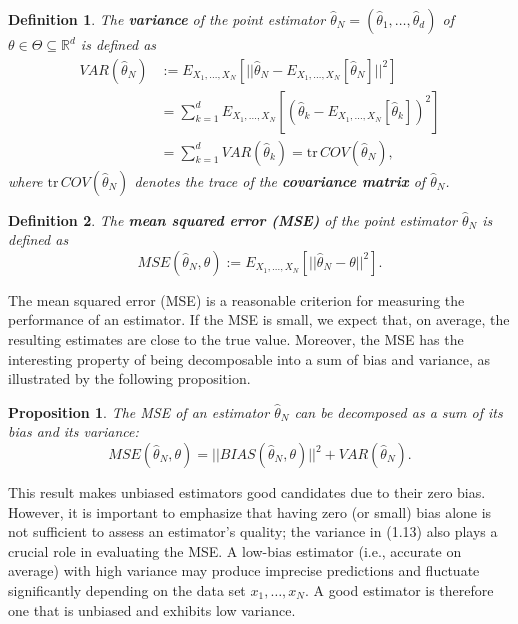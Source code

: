 \documentclass{report}
\newtheorem{definition}{Definition}[chapter]
\newtheorem{proposition}{Proposition}[chapter]
\begin{document}
\begin{definition}
The \textbf{variance} of the point estimator $\hat{\theta}_N = (\hat{\theta}_{1},\dots,\hat{\theta}_{d})$ of $\theta \in \Theta \subseteq \mathbb{R}^d$ is defined as
\begin{equation}
\begin{split}
VAR(\hat{\theta}_N) & := E_{X_1,\dots,X_N}[||\hat{\theta}_N-E_{X_1,\dots,X_N}[\hat{\theta}_N]||^2] \\
& = \sum_{k=1}^{d}E_{X_1,\dots,X_N}[(\hat{\theta}_{k}-E_{X_1,\dots,X_N}[\hat{\theta}_{k}])^2] \\
& = \sum_{k=1}^{d}VAR(\hat{\theta}_{k}) = \mathrm{tr}\,COV(\hat{\theta}_N),
\end{split}
\end{equation}
where $\mathrm{tr}\,COV(\hat{\theta}_N)$ denotes the trace of the \textbf{covariance matrix} of $\hat{\theta}_N$.
\end{definition}

\begin{definition}
The \textbf{mean squared error (MSE)} of the point estimator $\hat{\theta}_N$ is defined as
\begin{equation}
MSE(\hat{\theta}_N,\theta) := E_{X_1,\dots,X_N}[||\hat{\theta}_N - \theta||^2].
\end{equation}
\end{definition}

The mean squared error (MSE) is a reasonable criterion for measuring the performance of an estimator. If the MSE is small, we expect that, on average, the resulting estimates are close to the true value. Moreover, the MSE has the interesting property of being decomposable into a sum of bias and variance, as illustrated by the following proposition.

\begin{proposition}
The MSE of an estimator $\hat{\theta}_N$ can be decomposed as a sum of its bias and its variance:
\begin{equation}
MSE(\hat{\theta}_N,\theta) = ||BIAS(\hat{\theta}_N,\theta)||^2 + VAR(\hat{\theta}_N).
\end{equation}
\end{proposition}

This result makes unbiased estimators good candidates due to their zero bias. However, it is important to emphasize that having zero (or small) bias alone is not sufficient to assess an estimator’s quality; the variance in (1.13) also plays a crucial role in evaluating the MSE. A low-bias estimator (i.e., accurate on average) with high variance may produce imprecise predictions and fluctuate significantly depending on the data set $x_1,\dots,x_N$. A good estimator is therefore one that is unbiased and exhibits low variance.
\end{document}
